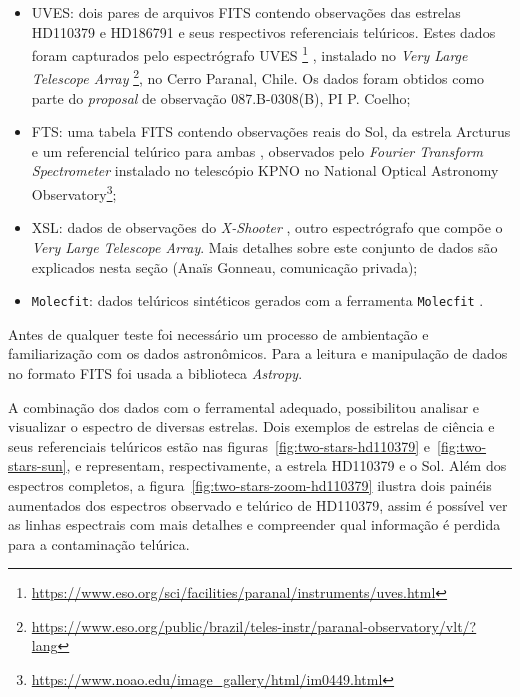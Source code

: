 \begin{itemize}
    \item UVES: dois pares de arquivos FITS contendo observações das estrelas HD110379 e HD186791 e seus respectivos referenciais telúricos. Estes dados foram capturados pelo espectrógrafo UVES \footnote{\url{https://www.eso.org/sci/facilities/paranal/instruments/uves.html}} \citep{2000SPIE.4008..534D}, instalado no \textit{Very Large Telescope Array} \footnote{\url{https://www.eso.org/public/brazil/teles-instr/paranal-observatory/vlt/?lang}}, no Cerro Paranal, Chile. Os dados foram obtidos como parte do \textit{proposal} de observação 087.B-0308(B), PI P. Coelho;
    \item FTS: uma tabela FITS contendo observações reais do Sol, da estrela Arcturus e um referencial telúrico para ambas \citep{arcturusflux:hinkle00}, observados pelo \textit{Fourier Transform Spectrometer} instalado no telescópio KPNO no National Optical Astronomy Observatory\footnote{\url{https://www.noao.edu/image_gallery/html/im0449.html}};
    \item XSL: dados de observações do \textit{X-Shooter} \citep{Chen2014TheXS, unpublished-xshooter-data-release}, outro espectrógrafo que compõe o \textit{Very Large Telescope Array}. Mais detalhes sobre este conjunto de dados são explicados nesta seção (Anaïs Gonneau, comunicação privada);
    \item\texttt{Molecfit}: dados telúricos sintéticos gerados com a ferramenta \texttt{Molecfit} \citep{smette2015molecfit}. 
\end{itemize}

Antes de qualquer teste foi necessário um processo de ambientação e familiarização com os dados astronômicos. Para a leitura e manipulação de dados no formato FITS foi usada a biblioteca \textit{Astropy}.

A combinação dos dados com o ferramental adequado, possibilitou analisar e visualizar o espectro de diversas estrelas. Dois exemplos de estrelas de ciência e seus referenciais telúricos estão nas figuras~\ref{fig:two-stars-hd110379} e~\ref{fig:two-stars-sun}, e representam, respectivamente, a estrela HD110379 e o Sol. Além dos espectros completos, a figura~\ref{fig:two-stars-zoom-hd110379} ilustra dois painéis aumentados dos espectros observado e telúrico de HD110379, assim é possível ver as linhas espectrais com mais detalhes e compreender qual informação é perdida para a contaminação telúrica.

